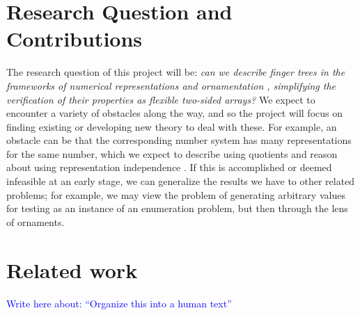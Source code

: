 \documentclass{article}
\theoremstyle{plain}%
\theoremstyle{definition}
\newcommand{\towrite}[1]{\par\textcolor{blue}{Write here about: ``#1''}\par}
\begin{document}
\section{Research Question and Contributions}\label{sec:research-question}
The research question of this project will be: \textit{can we describe finger trees \cite{fingertrees} in the frameworks of numerical representations and ornamentation \cite{progorn}, simplifying the verification of their properties as flexible two-sided arrays?} We expect to encounter a variety of obstacles along the way, and so the project will focus on finding existing or developing new theory to deal with these. For example, an obstacle can be that the corresponding number system has many representations for the same number, which we expect to describe using quotients \cite{cuagda} and reason about using representation independence \cite{iri}. If this is accomplished or deemed infeasible at an early stage, we can generalize the results we have to other related problems; for example, we may view the problem of generating arbitrary values for testing as an instance of an enumeration problem, but then through the lens of ornaments.

\section{Related work}\label{sec:resources}
\towrite{Organize this into a human text}
\end{document}
